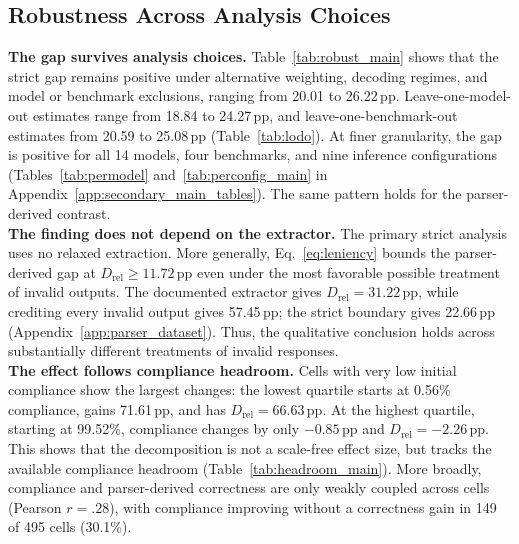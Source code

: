 \documentclass{article}
\newcommand{\pp}{\,pp}
\newcommand{\Drel}{D_{\mathrm{rel}}}
\begin{document}
\subsection{Robustness Across Analysis Choices}
\label{sec:robust}
\vspace{-2mm}
\noindent\textbf{The gap survives analysis choices.}
Table~\ref{tab:robust_main} shows that the strict gap remains positive under
alternative weighting, decoding regimes, and model or benchmark exclusions,
ranging from 20.01 to 26.22\pp{}. Leave-one-model-out estimates range from
18.84 to 24.27\pp{}, and leave-one-benchmark-out estimates from 20.59 to
25.08\pp{} (Table~\ref{tab:lodo}). At finer granularity, the gap is positive for all 14 models,
four benchmarks, and nine inference configurations
(Tables~\ref{tab:permodel} and~\ref{tab:perconfig_main} in
Appendix~\ref{app:secondary_main_tables}). The same pattern holds for the
parser-derived contrast.
\\
\noindent\textbf{The finding does not depend on the extractor.}
The primary strict analysis uses no relaxed extraction. More generally,
Eq.~\eqref{eq:leniency} bounds the parser-derived gap at
$\Drel\ge11.72$\pp{} even under the most favorable possible treatment of
invalid outputs. The documented extractor gives $\Drel=31.22$\pp{}, while
crediting every invalid output gives 57.45\pp{}; the strict boundary gives
22.66\pp{} (Appendix~\ref{app:parser_dataset}). Thus, the qualitative
conclusion holds across substantially different treatments of invalid
responses.
\\
\noindent\textbf{The effect follows compliance headroom.}
Cells with very low initial compliance show the largest changes: the lowest
quartile starts at 0.56\% compliance, gains 71.61\pp{}, and has
$\Drel=66.63$\pp{}. At the highest quartile, starting at 99.52\%, compliance
changes by only $-0.85$\pp{} and $\Drel=-2.26$\pp{}. This shows that the
decomposition is not a scale-free effect size, but tracks the available
compliance headroom (Table~\ref{tab:headroom_main}). More broadly, compliance and parser-derived correctness
are only weakly coupled across cells (Pearson $r=.28$), with compliance
improving without a correctness gain in 149 of 495 cells (30.1\%).
\end{document}
